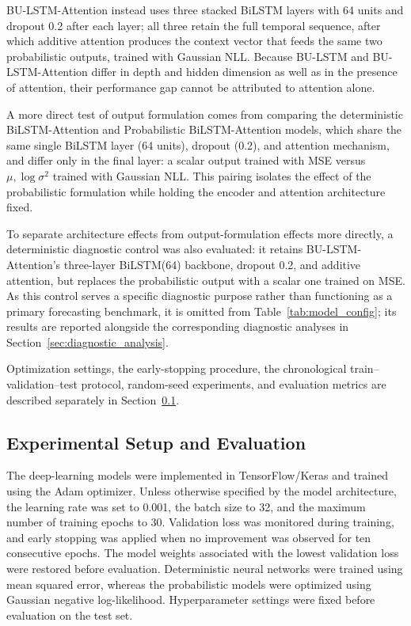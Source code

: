 \documentclass[referee,pdflatex,sn-basic]{sn-jnl}%
\theoremstyle{thmstyleone}%
\theoremstyle{thmstyletwo}%
\theoremstyle{thmstylethree}%
\begin{document}
BU-LSTM-Attention instead uses three stacked BiLSTM layers with 64 units and dropout 0.2 after each layer; all three retain the full temporal sequence, after which additive attention produces the context vector that feeds the same two probabilistic outputs, trained with Gaussian NLL. Because BU-LSTM and BU-LSTM-Attention differ in depth and hidden dimension as well as in the presence of attention, their performance gap cannot be attributed to attention alone.

A more direct test of output formulation comes from comparing the deterministic BiLSTM-Attention and Probabilistic BiLSTM-Attention models, which share the same single BiLSTM layer (64 units), dropout (0.2), and attention mechanism, and differ only in the final layer: a scalar output trained with MSE versus $\mu,\log\sigma^2$ trained with Gaussian NLL. This pairing isolates the effect of the probabilistic formulation while holding the encoder and attention architecture fixed.

To separate architecture effects from output-formulation effects more directly, a deterministic diagnostic control was also evaluated: it retains BU-LSTM-Attention's three-layer BiLSTM(64) backbone, dropout 0.2, and additive attention, but replaces the probabilistic output with a scalar one trained on MSE. As this control serves a specific diagnostic purpose rather than functioning as a primary forecasting benchmark, it is omitted from Table~\ref{tab:model_config}; its results are reported alongside the corresponding diagnostic analyses in Section~\ref{sec:diagnostic_analysis}.

Optimization settings, the early-stopping procedure, the chronological train--validation--test protocol, random-seed experiments, and evaluation metrics are described separately in Section~\ref{sec:experimental_setup}.


\subsection{Experimental Setup and Evaluation}
\label{sec:experimental_setup}

The deep-learning models were implemented in TensorFlow/Keras and trained using the Adam optimizer. Unless otherwise specified by the model architecture, the learning rate was set to 0.001, the batch size to 32, and the maximum number of training epochs to 30. Validation loss was monitored during training, and early stopping was applied when no improvement was observed for ten consecutive epochs. The model weights associated with the lowest validation loss were restored before evaluation. Deterministic neural networks were trained using mean squared error, whereas the probabilistic models were optimized using Gaussian negative log-likelihood. Hyperparameter settings were fixed before evaluation on the test set.
\end{document}
